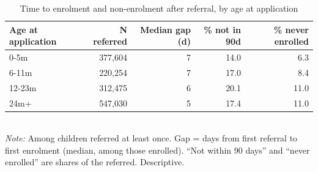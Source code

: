 \begin{table}[htbp]\centering
\caption{Time to enrolment and non-enrolment after referral, by age at application}
\label{tab:B3_aceitacao_idade}
\small
\setlength{\tabcolsep}{4pt}
\begin{tabular}{lrrrr}
\toprule
Age at application & N referred & Median gap (d) & \% not in 90d & \% never enrolled \\
\midrule
0-5m & 377,604 & 7 & 14.0 & 6.3 \\
6-11m & 220,254 & 7 & 17.0 & 8.4 \\
12-23m & 312,475 & 6 & 20.1 & 11.0 \\
24m+ & 547,030 & 5 & 17.4 & 11.0 \\
\bottomrule
\end{tabular}
\\[3pt]{\footnotesize \textit{Note:} Among children referred at least once. Gap = days from first referral to first enrolment (median, among those enrolled). ``Not within 90 days'' and ``never enrolled'' are shares of the referred. Descriptive.}
\end{table}
